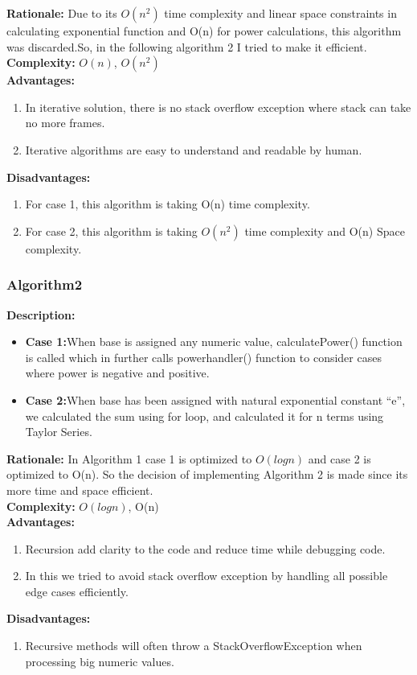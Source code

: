 \documentclass[a4paper,12pt]{report}
\begin{document}
\textbf{ Rationale: } Due to its $O(n^2)$ time complexity and linear space constraints in calculating exponential function and O(n) for power calculations, this algorithm was discarded.So, in the following algorithm 2 I tried to make it efficient.
\\\textbf{ Complexity: } $O(n)$, $O(n^2)$
\\\textbf{ Advantages: }
\begin{enumerate}
    \item In iterative solution, there is no stack overflow exception where stack can take no more frames.
    \item Iterative algorithms are easy to understand and readable by human.

\end{enumerate}
\textbf{ Disadvantages: }
\begin{enumerate}
    \item For case 1, this algorithm is taking O(n) time complexity.
    \item For case 2, this algorithm is taking $O(n^2)$ time complexity and O(n) Space complexity.

\end{enumerate}


\subsubsection{Algorithm2}

\textbf{ Description: }
\begin{itemize}
    \item \textbf{Case 1:}When base is assigned any numeric value, calculatePower() function is called which in further calls powerhandler() function to consider cases where power is negative and positive.
    \item \textbf{Case 2:}When base has been assigned with natural exponential constant “e”, we calculated the sum using for loop, and calculated it for n terms using Taylor Series.
\end{itemize}
\textbf{ Rationale: } In Algorithm 1 case 1 is optimized to $O(log n)$ and case 2 is optimized to  O(n). So the decision of implementing Algorithm 2 is made since its more time and space efficient.
\\\textbf{ Complexity: } $O(log n)$, O(n)
\\\textbf{ Advantages: }
\begin{enumerate}
    \item Recursion add clarity to the code and reduce time while debugging code.
    \item In this we tried to avoid stack overflow exception by handling all possible edge cases efficiently.
\end{enumerate}
\textbf{ Disadvantages: }
\begin{enumerate}
    \item Recursive methods will often throw a StackOverflowException when processing big numeric values.

\end{enumerate}
\end{document}
